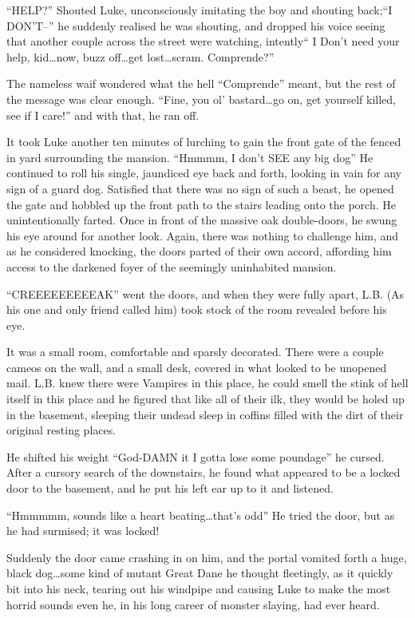 ``HELP?'' Shouted Luke, unconsciously imitating the boy and shouting
back;``I DON'T--'' he suddenly realised he was shouting, and dropped
his voice seeing that another couple across the street were
watching, intently`` I Don't need your help, kid{\ldots}now, buzz
off{\ldots}get lost{\ldots}scram. Comprende?''

The nameless waif wondered what the hell ``Comprende'' meant, but the
rest of the message was clear enough. ``Fine, you ol' bastard{\ldots}go
on, get yourself killed, see if I care!'' and with that, he ran
off.

It took Luke another ten minutes of lurching to gain the front gate
of the fenced in yard surrounding the mansion. ``Hmmmm, I don't SEE
any big dog'' He continued to roll his single, jaundiced eye back
and forth, looking in vain for any sign of a guard dog. Satisfied
that there was no sign of such a beast, he opened the gate and
hobbled up the front path to the stairs leading onto the porch. He
unintentionally farted. Once in front of the massive oak
double-doors, he swung his eye around for another look. Again,
there was nothing to challenge him, and as he considered knocking,
the doors parted of their own accord, affording him access to the
darkened foyer of the seemingly uninhabited mansion.

``CREEEEEEEEEAK'' went the doors, and when they were fully apart,
L.B. (As his one and only friend called him) took stock of the room
revealed before his eye.

It was a small room, comfortable and sparsly decorated. There were
a couple cameos on the wall, and a small desk, covered in what
looked to be unopened mail. L.B. knew there were Vampires in this
place, he could smell the stink of hell itself in this place and he
figured that like all of their ilk, they would be holed up in the
basement, sleeping their undead sleep in coffins filled with the
dirt of their original resting places.

He shifted his weight ``God-DAMN it I gotta lose some poundage'' he
cursed. After a cursory search of the downstairs, he found what
appeared to be a locked door to the basement, and he put his left
ear up to it and listened.

``Hmmmmm, sounds like a heart beating{\ldots}that's odd'' He tried the
door, but as he had surmised; it was locked!

Suddenly the door came crashing in on him, and the portal vomited
forth a huge, black dog{\ldots}some kind of mutant Great Dane he thought
fleetingly, as it quickly bit into his neck, tearing out his
windpipe and causing Luke to make the most horrid sounds even he,
in his long career of monster slaying, had ever heard.

